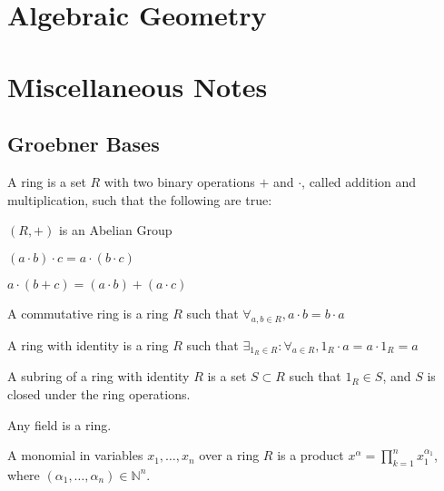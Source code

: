 \documentclass[crop=false,class=article,oneside]{standalone}
\begin{document}
    \ifx\ifmathcoursesalgebraicgeometry\undefined
        \section*{Algebraic Geometry}
        \setcounter{section}{2}
    \else
        \section{Miscellaneous Notes}
    \fi
    \subsection{Groebner Bases}
        \begin{definition}
            A ring is a set $R$ with two binary operations $+$
            and $\cdot$, called addition and multiplication,
            such that the following are true:
            \begin{enumerate}
                \begin{multicols}{3}
                    \item $(R,+)$ is an Abelian Group
                    \item $(a\cdot{b})\cdot{c}=a\cdot(b\cdot{c})$
                    \item $a\cdot(b+c)=(a\cdot b)+(a\cdot c)$
                \end{multicols}
            \end{enumerate}
        \end{definition}
        \begin{definition}
            A commutative ring is a ring $R$ such that
            $\forall_{a,b\in R},a\cdot{b}=b\cdot{a}$
        \end{definition}
        \begin{definition}
            A ring with identity is a ring $R$ such that
            $\exists_{1_{R}\in R}:\forall_{a\in R}, 1_{R}\cdot a=a\cdot 1_{R}=a$
        \end{definition}
        \begin{definition}
            A subring of a ring with identity $R$ is a set
            $S\subset R$ such that $1_{R}\in S$, and $S$ is
            closed under the ring operations.
        \end{definition}
        \begin{remark}
            Any field is a ring.
        \end{remark}
        \begin{definition}
            A monomial in variables $x_1,\hdots, x_n$ over a
            ring $R$ is a product
            $x^\alpha=\prod_{k=1}^{n} x_1^{\alpha_1}$,
            where $(\alpha_1,\hdots,\alpha_n)\in \mathbb{N}^n$.
        \end{definition}
\end{document}
